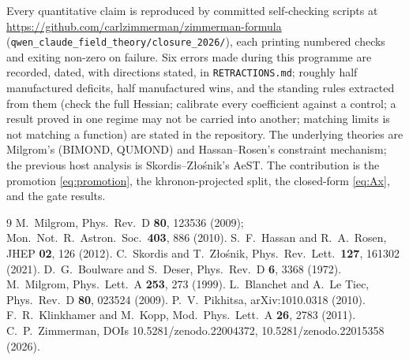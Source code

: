 \documentclass[aps,prd,twocolumn,10pt,nofootinbib,superscriptaddress]{revtex4-2}
\begin{document}
\begin{acknowledgments}
Every quantitative claim is reproduced by committed self-checking scripts at
\url{https://github.com/carlzimmerman/zimmerman-formula}
(\texttt{qwen\_claude\_field\_theory/closure\_2026/}), each printing numbered checks and exiting
non-zero on failure. Six errors made during this programme are recorded, dated, with directions
stated, in \texttt{RETRACTIONS.md}; roughly half manufactured deficits, half manufactured wins,
and the standing rules extracted from them (check the full Hessian; calibrate every coefficient
against a control; a result proved in one regime may not be carried into another; matching
limits is not matching a function) are stated in the repository. The underlying theories are
Milgrom's (BIMOND, QUMOND) and Hassan--Rosen's constraint mechanism; the previous host analysis
is Skordis--Z\l o\'snik's AeST. The contribution is the promotion \eqref{eq:promotion}, the
khronon-projected split, the closed-form \eqref{eq:Ax}, and the gate results.
\end{acknowledgments}

\begin{thebibliography}{9}
 M.~Milgrom, Phys.\ Rev.\ D \textbf{80}, 123536 (2009); Mon.\ Not.\ R.\ Astron.\
Soc.\ \textbf{403}, 886 (2010).
 S.~F.~Hassan and R.~A.~Rosen, JHEP \textbf{02}, 126 (2012).
\bibitem{SZ} C.~Skordis and T.~Z\l o\'snik, Phys.\ Rev.\ Lett.\ \textbf{127}, 161302 (2021).
\bibitem{BD} D.~G.~Boulware and S.~Deser, Phys.\ Rev.\ D \textbf{6}, 3368 (1972).
\bibitem{M99} M.~Milgrom, Phys.\ Lett.\ A \textbf{253}, 273 (1999).
\bibitem{BLT} L.~Blanchet and A.~Le Tiec, Phys.\ Rev.\ D \textbf{80}, 023524 (2009).
\bibitem{Pik} P.~V.~Pikhitsa, arXiv:1010.0318 (2010).
 F.~R.~Klinkhamer and M.~Kopp, Mod.\ Phys.\ Lett.\ A \textbf{26}, 2783 (2011).
\bibitem{TR} C.~P.~Zimmerman, DOIs 10.5281/zenodo.22004372, 10.5281/zenodo.22015358 (2026).
\end{thebibliography}
\end{document}
